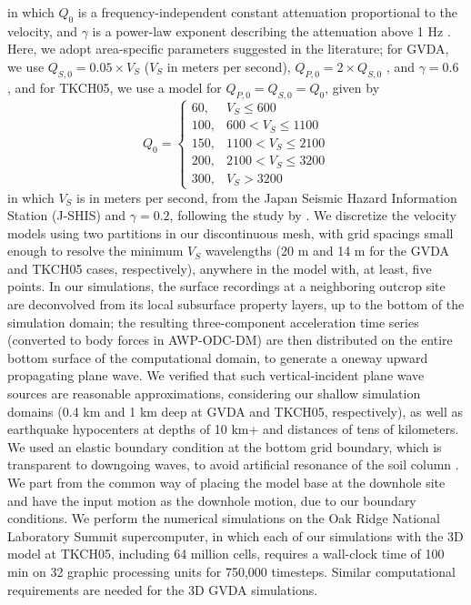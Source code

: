 \noindent in which $Q_0$ is a frequency-independent constant attenuation proportional to the velocity, and $\gamma$ is a power-law exponent describing the attenuation above 1 Hz \citep{withersMemoryEfficientSimulation2015}. Here, we adopt area-specific parameters suggested in the literature; for GVDA, we use $Q_{S,0}=0.05 \times V_S$ ($V_S$ in meters per second), $Q_{P,0}=2 \times Q_{S,0}$ , and $\gamma=0.6$ \citep[for southern Calfornia]{withersMemoryEfficientSimulation2015}, and for TKCH05, we use a model for $Q_{P,0}=Q_{S,0}=Q_0$, given by
\begin{equation}
  Q_{0}=\left\{\begin{array}{ll}
    60,  & V_{S} \leq 600       \\
    100, & 600<V_{S} \leq 1100  \\
    150, & 1100<V_{S} \leq 2100 \\
    \label{eq:etf-5}
    200, & 2100<V_{S} \leq 3200 \\
    300, & V_{S}>3200
  \end{array}\right.
\end{equation}
\noindent in which $V_S$ is in meters per second, from the Japan Seismic Hazard Information Station (J-SHIS) and $\gamma=0.2$, following the study by \citet{nakajimaSeismicAttenuationNortheastern2013}. We discretize the velocity models using two partitions in our discontinuous mesh, with grid spacings small enough to resolve the minimum $V_S$ wavelengths (20 m and 14 m for the GVDA and TKCH05 cases, respectively), anywhere in the model with, at least, five points. In our simulations, the surface recordings at a neighboring outcrop site are deconvolved from its local subsurface property layers, up to the bottom of the simulation domain; the resulting three-component acceleration time series (converted to body forces in AWP-ODC-DM) are then distributed on the entire bottom surface of the computational domain, to generate a oneway upward propagating plane wave. We verified that such vertical-incident plane wave sources are reasonable approximations, considering our shallow simulation domains (0.4 km and 1 km deep at GVDA and TKCH05, respectively), as well as earthquake hypocenters at depths of 10 km+ and distances of tens of kilometers. We used an elastic boundary condition at the bottom grid boundary, which is transparent to downgoing waves, to avoid artificial resonance of the soil column \citep{roten3DSimulationsEarthquakes2012}. We part from the common way of placing the model base at the downhole site and have the input motion as the downhole motion, due to our boundary conditions. We perform the numerical simulations on the Oak Ridge National Laboratory Summit supercomputer, in which each of our simulations with the 3D model at TKCH05, including 64 million cells, requires a wall-clock time of 100 min on 32 graphic processing units for 750,000 timesteps. Similar computational requirements are needed for the 3D GVDA simulations.


